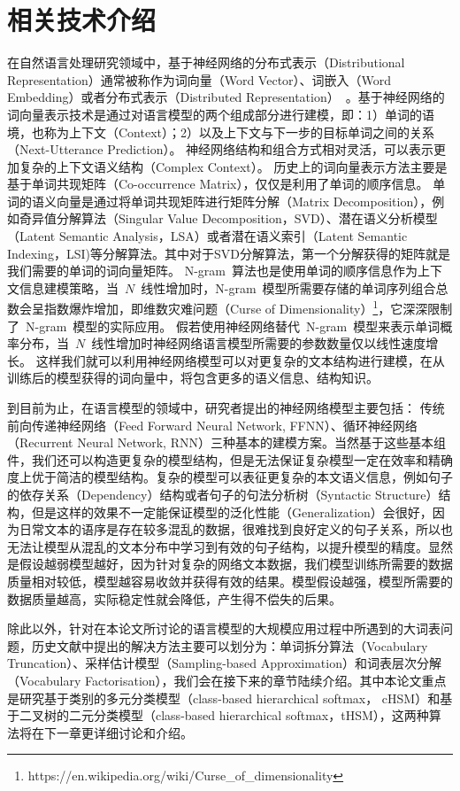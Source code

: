 \chapter{相关技术介绍}
在自然语言处理研究领域中，基于神经网络的分布式表示（Distributional Representation）通常被称作为词向量（Word Vector）、词嵌入（Word Embedding）或者分布式表示（Distributed Representation）~。基于神经网络的词向量表示技术是通过对语言模型的两个组成部分进行建模，即：1）单词的语境，也称为上下文（Context）；2）以及上下文与下一步的目标单词之间的关系（Next-Utterance Prediction）。
神经网络结构和组合方式相对灵活，可以表示更加复杂的上下文语义结构（Complex Context）。
历史上的词向量表示方法主要是基于单词共现矩阵（Co-occurrence Matrix），仅仅是利用了单词的顺序信息。
单词的语义向量是通过将单词共现矩阵进行矩阵分解（Matrix Decomposition），例如奇异值分解算法（Singular Value Decomposition，SVD）、潜在语义分析模型（Latent Semantic Analysis，LSA）或者潜在语义索引（Latent Semantic Indexing，LSI)等分解算法。其中对于SVD分解算法，第一个分解获得的矩阵就是我们需要的单词的词向量矩阵。
N-gram~算法也是使用单词的顺序信息作为上下文信息建模策略，当~$N$~线性增加时，N-gram~模型所需要存储的单词序列组合总数会呈指数爆炸增加，即维数灾难问题（Curse of Dimensionality）\footnote{https://en.wikipedia.org/wiki/Curse\_of\_dimensionality}，它深深限制了~N-gram~模型的实际应用。
假若使用神经网络替代~N-gram~模型来表示单词概率分布，当~$N$~线性增加时神经网络语言模型所需要的参数数量仅以线性速度增长。
这样我们就可以利用神经网络模型可以对更复杂的文本结构进行建模，在从训练后的模型获得的词向量中，将包含更多的语义信息、结构知识。

到目前为止，在语言模型的领域中，研究者提出的神经网络模型主要包括： 传统前向传递神经网络（Feed Forward Neural Network, FFNN）、循环神经网络（Recurrent Neural Network, RNN）三种基本的建模方案。当然基于这些基本组件，我们还可以构造更复杂的模型结构，但是无法保证复杂模型一定在效率和精确度上优于简洁的模型结构。复杂的模型可以表征更复杂的本文语义信息，例如句子的依存关系（Dependency）结构或者句子的句法分析树（Syntactic Structure）结构，但是这样的效果不一定能保证模型的泛化性能（Generalization）会很好，因为日常文本的语序是存在较多混乱的数据，很难找到良好定义的句子关系，所以也无法让模型从混乱的文本分布中学习到有效的句子结构，以提升模型的精度。显然是假设越弱模型越好，因为针对复杂的网络文本数据，我们模型训练所需要的数据质量相对较低，模型越容易收敛并获得有效的结果。模型假设越强，模型所需要的数据质量越高，实际稳定性就会降低，产生得不偿失的后果。


除此以外，针对在本论文所讨论的语言模型的大规模应用过程中所遇到的大词表问题，历史文献中提出的解决方法主要可以划分为：单词拆分算法（Vocabulary Truncation）、采样估计模型（Sampling-based Approximation）和词表层次分解（Vocabulary Factorisation），我们会在接下来的章节陆续介绍。其中本论文重点是研究基于类别的多元分类模型（class-based hierarchical softmax， cHSM）和基于二叉树的二元分类模型（class-based hierarchical softmax，tHSM），这两种算法将在下一章更详细讨论和介绍。

